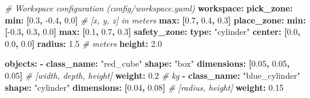 \documentclass[
]{article}
\newenvironment{Shaded}{\begin{snugshade}}{\end{snugshade}}
\newcommand{\AttributeTok}[1]{\textcolor[rgb]{0.13,0.29,0.53}{#1}}
\newcommand{\CommentTok}[1]{\textcolor[rgb]{0.56,0.35,0.01}{\textit{#1}}}
\newcommand{\FloatTok}[1]{\textcolor[rgb]{0.00,0.00,0.81}{#1}}
\newcommand{\FunctionTok}[1]{\textcolor[rgb]{0.13,0.29,0.53}{\textbf{#1}}}
\newcommand{\KeywordTok}[1]{\textcolor[rgb]{0.13,0.29,0.53}{\textbf{#1}}}
\newcommand{\StringTok}[1]{\textcolor[rgb]{0.31,0.60,0.02}{#1}}
\begin{document}
\begin{Shaded}
\begin{Highlighting}[]
\CommentTok{\# Workspace configuration (config/workspace.yaml)}
\FunctionTok{workspace}\KeywordTok{:}
\AttributeTok{  }\FunctionTok{pick\_zone}\KeywordTok{:}
\AttributeTok{    }\FunctionTok{min}\KeywordTok{:}\AttributeTok{ }\KeywordTok{[}\FloatTok{0.3}\KeywordTok{,}\AttributeTok{ }\FloatTok{{-}0.4}\KeywordTok{,}\AttributeTok{ }\FloatTok{0.0}\KeywordTok{]}\CommentTok{   \# [x, y, z] in meters}
\AttributeTok{    }\FunctionTok{max}\KeywordTok{:}\AttributeTok{ }\KeywordTok{[}\FloatTok{0.7}\KeywordTok{,}\AttributeTok{ }\FloatTok{0.4}\KeywordTok{,}\AttributeTok{ }\FloatTok{0.3}\KeywordTok{]}
\AttributeTok{  }\FunctionTok{place\_zone}\KeywordTok{:}
\AttributeTok{    }\FunctionTok{min}\KeywordTok{:}\AttributeTok{ }\KeywordTok{[}\FloatTok{{-}0.3}\KeywordTok{,}\AttributeTok{ }\FloatTok{0.3}\KeywordTok{,}\AttributeTok{ }\FloatTok{0.0}\KeywordTok{]}
\AttributeTok{    }\FunctionTok{max}\KeywordTok{:}\AttributeTok{ }\KeywordTok{[}\FloatTok{0.1}\KeywordTok{,}\AttributeTok{ }\FloatTok{0.7}\KeywordTok{,}\AttributeTok{ }\FloatTok{0.3}\KeywordTok{]}
\AttributeTok{  }\FunctionTok{safety\_zone}\KeywordTok{:}
\AttributeTok{    }\FunctionTok{type}\KeywordTok{:}\AttributeTok{ }\StringTok{"cylinder"}
\AttributeTok{    }\FunctionTok{center}\KeywordTok{:}\AttributeTok{ }\KeywordTok{[}\FloatTok{0.0}\KeywordTok{,}\AttributeTok{ }\FloatTok{0.0}\KeywordTok{,}\AttributeTok{ }\FloatTok{0.0}\KeywordTok{]}
\AttributeTok{    }\FunctionTok{radius}\KeywordTok{:}\AttributeTok{ }\FloatTok{1.5}\CommentTok{  \# meters}
\AttributeTok{    }\FunctionTok{height}\KeywordTok{:}\AttributeTok{ }\FloatTok{2.0}

\FunctionTok{objects}\KeywordTok{:}
\AttributeTok{  }\KeywordTok{{-}}\AttributeTok{ }\FunctionTok{class\_name}\KeywordTok{:}\AttributeTok{ }\StringTok{"red\_cube"}
\AttributeTok{    }\FunctionTok{shape}\KeywordTok{:}\AttributeTok{ }\StringTok{"box"}
\AttributeTok{    }\FunctionTok{dimensions}\KeywordTok{:}\AttributeTok{ }\KeywordTok{[}\FloatTok{0.05}\KeywordTok{,}\AttributeTok{ }\FloatTok{0.05}\KeywordTok{,}\AttributeTok{ }\FloatTok{0.05}\KeywordTok{]}\CommentTok{  \# [width, depth, height]}
\AttributeTok{    }\FunctionTok{weight}\KeywordTok{:}\AttributeTok{ }\FloatTok{0.2}\CommentTok{  \# kg}
\AttributeTok{  }\KeywordTok{{-}}\AttributeTok{ }\FunctionTok{class\_name}\KeywordTok{:}\AttributeTok{ }\StringTok{"blue\_cylinder"}
\AttributeTok{    }\FunctionTok{shape}\KeywordTok{:}\AttributeTok{ }\StringTok{"cylinder"}
\AttributeTok{    }\FunctionTok{dimensions}\KeywordTok{:}\AttributeTok{ }\KeywordTok{[}\FloatTok{0.04}\KeywordTok{,}\AttributeTok{ }\FloatTok{0.08}\KeywordTok{]}\CommentTok{  \# [radius, height]}
\AttributeTok{    }\FunctionTok{weight}\KeywordTok{:}\AttributeTok{ }\FloatTok{0.15}
\end{Highlighting}
\end{Shaded}
\end{document}
